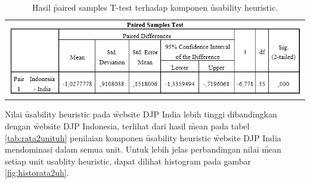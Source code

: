 \begin{table}[h]
	\centering
	\caption{Hasil \f{paired samples T-test} terhadap komponen \f{usability heuristic}.}
	\label{tab:ttestuh}
	\begin{tabular}{c}
		\includegraphics[width=\textwidth]
		{pics/ordinalT-testUH.PNG}
	\end{tabular}
\end{table}
Nilai \f{usability heuristic} pada \f{website} DJP India lebih tinggi dibandingkan dengan \f{website} DJP Indonesia, terlihat dari hasil \f{mean} pada tabel \ref{tab:rata2unituh} penilaian komponen \f{usability heuristic} \f{website} DJP India mendominasi dalam semua unit. Untuk lebih jelas perbandingan nilai \f{mean} setiap unit usablity heuristic, dapat dilihat histogram pada gambar \ref{fig:historata2uh}.
\begin{table}
	\centering
	\caption{Rata-rata nilai unit pada komponen \f{usability heuristic}}
	\label{tab:rata2unituh}
\end{table}

